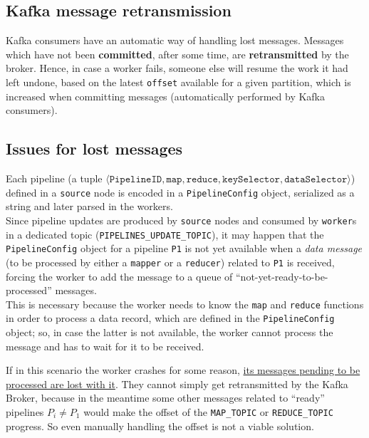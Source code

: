 \subsection{Kafka message retransmission}
Kafka consumers have an automatic way of handling lost messages. Messages which have not been \textbf{committed}, after some time, are \textbf{retransmitted} by the broker. Hence, in case a worker fails, someone else will resume the work it had left undone, based on the latest \texttt{offset} available for a given partition, which is increased when committing messages (automatically performed by Kafka consumers).

\subsection{Issues for lost messages}
Each pipeline (a tuple $\langle \texttt{PipelineID}, \texttt{map}, \texttt{reduce}, \texttt{keySelector}, \texttt{dataSelector} \rangle$) defined in a \texttt{source} node is encoded in a \lstinline|PipelineConfig| object, serialized as a string and later parsed in the workers.\\ 
Since pipeline updates are produced by \texttt{source} nodes and consumed by \texttt{worker}s in a dedicated topic (\lstinline|PIPELINES_UPDATE_TOPIC|), it may happen that the \lstinline|PipelineConfig| object for a pipeline \lstinline|P1| is not yet available when a \textit{data message} (to be processed by either a \texttt{mapper} or a \texttt{reducer}) related to \lstinline|P1| is received, forcing the worker to add the message to a queue of ``not-yet-ready-to-be-processed'' messages.\\
This is necessary because the worker needs to know the \lstinline|map| and \lstinline|reduce| functions in order to process a data record, which are defined in the \lstinline|PipelineConfig| object;
so, in case the latter is not available, the worker cannot process the message and has to wait for it to be received.

If in this scenario the worker crashes for some reason, \ul{its messages pending to be processed are lost with it}.
They cannot simply get retransmitted by the Kafka Broker, because in the meantime some other messages related to ``ready'' pipelines $P_i \neq P_1$ would make the offset of the \lstinline|MAP_TOPIC| or \lstinline|REDUCE_TOPIC| progress.
So even manually handling the offset is not a viable solution.


